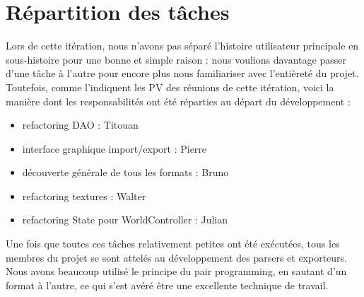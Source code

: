 \section{Répartition des tâches}

Lors de cette itération, nous n'avons pas séparé l'histoire utilisateur principale en sous-histoire pour une bonne et simple raison : nous voulions davantage passer d'une tâche à l'autre pour encore plus nous familiariser avec l'entièreté du projet.\\

Toutefois, comme l'indiquent les PV des réunions de cette itération, voici la manière dont les responsabilités ont été réparties au départ du développement : 
\begin{itemize}
\item refactoring DAO : Titouan
\item interface graphique import/export : Pierre
\item découverte générale de tous les formats : Bruno
\item refactoring textures : Walter
\item refactoring State pour WorldController : Julian
\end{itemize}

Une fois que toutes ces tâches relativement petites ont été exécutées, tous les membres du projet se sont attelés au développement des parsers et exporteurs. Nous avons beaucoup utilisé le principe du pair programming, en sautant d'un format à l'autre, ce qui s'est avéré être une excellente technique de travail.